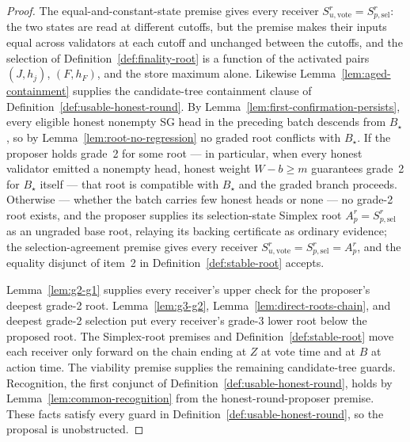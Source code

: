 \begin{proof}
The equal-and-constant-state premise gives every receiver
\(S_{u,\mathrm{vote}}^r=S_{p,\mathrm{sel}}^r\): the two states are
read at different cutoffs, but the premise makes their inputs equal
across validators at each cutoff and unchanged between the cutoffs, and
the selection of Definition~\ref{def:finality-root} is a function of
the activated pairs \((J,h_j)\), \((F,h_F)\), and the store maximum
alone.  Likewise
Lemma~\ref{lem:aged-containment} supplies the candidate-tree
containment clause of Definition~\ref{def:usable-honest-round}.
By Lemma~\ref{lem:first-confirmation-persists}, every eligible honest
nonempty SG head in the preceding batch descends from \(B_\star\), so by
Lemma~\ref{lem:root-no-regression} no graded root conflicts with
\(B_\star\).  If the proposer holds grade~2 for some root --- in
particular, when every honest validator emitted a nonempty head, honest
weight \(W-b\geq m\) guarantees grade~2 for \(B_\star\) itself --- that
root is compatible with \(B_\star\) and the graded branch proceeds.
Otherwise --- whether the batch carries few honest heads or none --- no
grade-2 root exists, and the proposer supplies
its selection-state Simplex root \(A_p^r=S_{p,\mathrm{sel}}^r\) as an
ungraded base root, relaying its backing
certificate as ordinary evidence; the selection-agreement premise gives
every receiver \(S_{u,\mathrm{vote}}^r=S_{p,\mathrm{sel}}^r=A_p^r\), and
the equality disjunct of item~2 in Definition~\ref{def:stable-root}
accepts.

Lemma~\ref{lem:g2-g1} supplies every receiver's upper check for the
proposer's deepest grade-2 root.  Lemma~\ref{lem:g3-g2},
Lemma~\ref{lem:direct-roots-chain}, and deepest grade-2 selection put every
receiver's grade-3 lower root below the proposed root.  The Simplex-root
premises and Definition~\ref{def:stable-root} move each receiver only forward
on the chain ending at \(Z\) at vote time and at \(B\) at action time.  The
viability premise supplies the remaining candidate-tree guards.
Recognition, the first conjunct of
Definition~\ref{def:usable-honest-round}, holds by
Lemma~\ref{lem:common-recognition} from the honest-round-proposer
premise.  These facts satisfy every guard in
Definition~\ref{def:usable-honest-round}, so the proposal is
unobstructed.
\end{proof}

